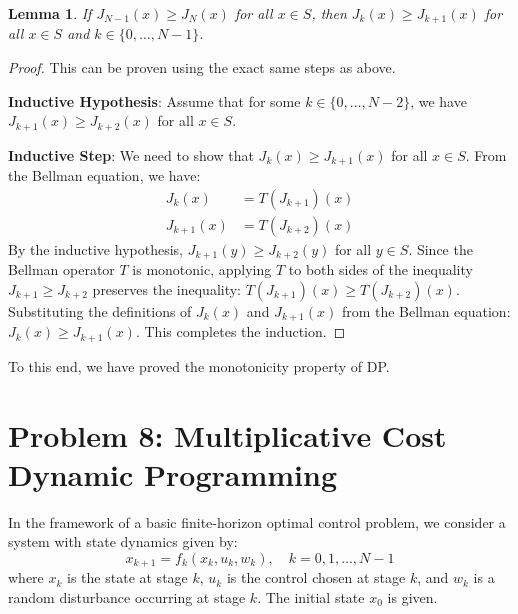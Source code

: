 \documentclass[11pt, a4paper, oneside]{memoir}
\newtheorem{lemma}{Lemma}
\begin{document}
\begin{lemma}
  If $J_{N-1}(x) \ge J_N(x)$ for all $x \in S$, then $J_k(x) \ge J_{k+1}(x)$ for all $x \in S$ and $k \in \{0, \dots, N-1\}$.
\end{lemma}

\begin{proof}
  This can be proven using the exact same steps as above.

  \textbf{Inductive Hypothesis}:
  Assume that for some $k \in \{0, \dots, N-2\}$, we have $J_{k+1}(x) \ge J_{k+2}(x)$ for all $x \in S$.

  \textbf{Inductive Step}:
  We need to show that $J_k(x) \ge J_{k+1}(x)$ for all $x \in S$.
  From the Bellman equation, we have:
  \begin{align*}
    J_k(x)     & = T(J_{k+1})(x) \\
    J_{k+1}(x) & = T(J_{k+2})(x)
  \end{align*}
  By the inductive hypothesis, $J_{k+1}(y) \ge J_{k+2}(y)$ for all $y \in S$.
  Since the Bellman operator $T$ is monotonic, applying $T$ to both sides of the inequality $J_{k+1} \ge J_{k+2}$ preserves the inequality:
  $T(J_{k+1})(x) \ge T(J_{k+2})(x)$.
  Substituting the definitions of $J_k(x)$ and $J_{k+1}(x)$ from the Bellman equation:
  $J_k(x) \ge J_{k+1}(x)$.
  This completes the induction.
\end{proof}

To this end, we have proved the monotonicity property of DP.

\chapter{Problem 8: Multiplicative Cost Dynamic Programming}
In the framework of a basic finite-horizon optimal control problem, we consider a system with state dynamics given by:
\[
  x_{k+1} = f_k(x_k, u_k, w_k), \quad k = 0, 1, \dots, N-1
\]
where $x_k$ is the state at stage $k$, $u_k$ is the control chosen at stage $k$,
and $w_k$ is a random disturbance occurring at stage $k$. The initial state $x_0$ is given.
\end{document}
